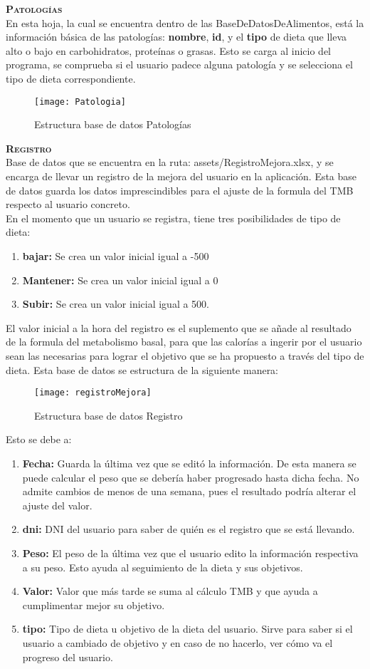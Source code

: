 \textbf{\textsc{Patologías}}\\
En esta hoja, la cual se encuentra dentro de las BaseDeDatosDeAlimentos, está la información básica de las patologías: \textbf{nombre}, \textbf{id}, y el \textbf{tipo} de dieta que lleva alto o bajo en carbohidratos, proteínas o grasas. Esto se carga al inicio del programa, se comprueba si el usuario padece alguna patología y se selecciona el tipo de dieta correspondiente.\\
\begin{figure}[htb]
\centering
\texttt{[image: Patologia]} 
\caption{Estructura base de datos Patologías}
\end{figure}

\textbf{\textsc{Registro}}\\
Base de datos que se encuentra en la ruta: assets/RegistroMejora.xlsx, y se encarga de llevar un registro de la mejora del usuario en la aplicación. Esta base de datos guarda los datos imprescindibles para el ajuste de la formula del TMB respecto al usuario concreto.\\
En el momento que un usuario se registra, tiene tres posibilidades de tipo de dieta:
\begin{enumerate}
\item \textbf{bajar:} Se crea un valor inicial igual a -500
\item \textbf{Mantener:} Se crea un valor inicial igual a 0
\item \textbf{Subir:} Se crea un valor inicial igual a 500. 
\end{enumerate}
El valor inicial a la hora del registro es el suplemento que se añade al resultado de la formula del metabolismo basal, para que las calorías a ingerir por el usuario sean las necesarias para lograr el objetivo que se ha propuesto a través del tipo de dieta.
Esta base de datos se estructura de la siguiente manera:
\begin{figure}[htb]
\centering
\texttt{[image: registroMejora]} 
\caption{Estructura base de datos Registro}
\end{figure}
Esto se debe a:
\begin{enumerate}
\item \textbf{Fecha:} Guarda la última vez que se editó la información. De esta manera se puede calcular el peso que se debería haber progresado hasta dicha fecha. No admite cambios de menos de una semana, pues el resultado podría alterar el ajuste del valor.
\item \textbf{dni:} DNI del usuario para saber de quién es el registro que se está llevando.
\item \textbf{Peso:} El peso de la última vez que el usuario edito la información respectiva a su peso. Esto ayuda al seguimiento de la dieta y sus objetivos.
\item \textbf{Valor:} Valor que más tarde se suma al cálculo TMB y que ayuda a cumplimentar mejor su objetivo.
\item \textbf{tipo:} Tipo de dieta u objetivo de la dieta del usuario. Sirve para saber si el usuario a cambiado de objetivo y en caso de no hacerlo, ver cómo va el progreso del usuario.
\end{enumerate}

